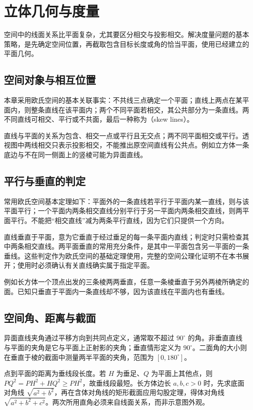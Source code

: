 \documentclass[UTF8]{ctexbook}
\begin{document}
\chapter{立体几何与度量}
\label{chap:em-solid}
空间中的线面关系比平面复杂，尤其要区分相交与投影相交。解决度量问题的基本策略，是先确定空间位置，再截取包含目标长度或角的恰当平面，使用已经建立的平面几何。

\section{空间对象与相互位置}
本章采用欧氏空间的基本关联事实：不共线三点确定一个平面；直线上两点在某平面内，则整条直线在该平面内；两个不同平面若相交，其公共部分为一条直线。两不同直线可相交、平行或不共面，最后一种称为（skew lines）。

直线与平面的关系为包含、相交一点或平行且无交点；两不同平面相交或平行。透视图中两线相交只表示投影相交，不能推出原空间直线有公共点。例如立方体一条底边与不在同一侧面上的竖棱可能为异面直线。

\section{平行与垂直的判定}
常用欧氏空间基本定理如下：平面外的一条直线若平行于平面内某一直线，则与该平面平行；一个平面内两条相交直线分别平行于另一平面内两条相交直线，则两平面平行。不能把“相交直线”减为两条平行直线，因为它们只提供一个方向。

直线垂直于平面，意为它垂直于经过垂足的每一条平面内直线；判定时只需检查其中两条相交直线。两平面垂直的常用充分条件，是其中一平面包含另一平面的一条垂线。这些判定作为欧氏空间的基础定理使用，完整的空间公理化证明不在本书展开；使用时必须确认有关直线确实属于指定平面。

例如长方体一个顶点出发的三条棱两两垂直，任意一条棱垂直于另外两棱所确定的面。已知只垂直于平面内一条直线却不够，因为该直线在平面内也有垂线。

\section{空间角、距离与截面}
异面直线夹角通过平移方向到共同点定义，通常取不超过 $90^\circ$ 的角。非垂直直线与平面的夹角是它与平面上正射影的夹角；垂直情形定义为 $90^\circ$。二面角的大小则在垂直于棱的截面中测量两半平面的夹角，范围为 $[0,180^\circ]$。

点到平面的距离为垂线段长度。若 $H$ 为垂足、$Q$ 为平面上其他点，则 $PQ^2=PH^2+HQ^2\ge PH^2$，故垂线段最短。长方体边长 $a,b,c>0$ 时，先求底面对角线 $\sqrt{a^2+b^2}$，再在含体对角线的矩形截面应用勾股定理，得体对角线 $\sqrt{a^2+b^2+c^2}$。两次所用直角必须来自线面关系，而非示意图外观。
\end{document}
